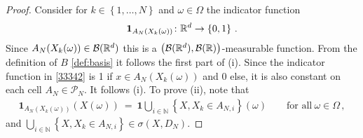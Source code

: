 \begin{proof}
Consider
for $k\in \left\{
  1,\ldots,N
\right\}$
and $\omega\in\Omega$
the indicator function
\begin{align}
  \label{33342}
  \mathbf{1}
  _
  {A_N(X_k(\omega))}
  \colon \mathbb{R}^d\to \left\{
    0,1
  \right\}
  \,.
\end{align}
Since 
$
  {A_N(X_k(\omega))}
  \in\mathcal{B}(\mathbb{R}^d)
$
this is a 
  $\left(
    \mathcal{B}(\mathbb{R}^d),\mathcal{B}(\mathbb{R})
  \right)$-measurable
  function.
  From the definition of $B$ \eqref{def:basis} it follows the first part of (i).
  Since the indicator function in \eqref{33342} is 1 if $
  x\in
  {A_N(X_k(\omega))}
  $
  and 0 else, it is also constant on each cell
  $A_N\in\mathcal{P}_N$.
  It follows (i).
  To prove (ii), note that
\begin{align*}
  \mathbf{1}
  _
  {A_N(X_k(\omega))}(X(\omega))
  \ 
  =
  \ 
  \mathbf{1}
  \bigcup_{i\in\mathbb{N}}
  \left\{
    X,X_k \in A_{N,i}
  \right\}
  (\omega)
  \qquad
  \text{for all}\ 
  \omega\in\Omega
  \,,
\end{align*}
and
$
  \bigcup_{i\in\mathbb{N}}
  \left\{
    X,X_k \in A_{N,i}
  \right\}
  \in\sigma(X,D_N)
  $.
\end{proof}


